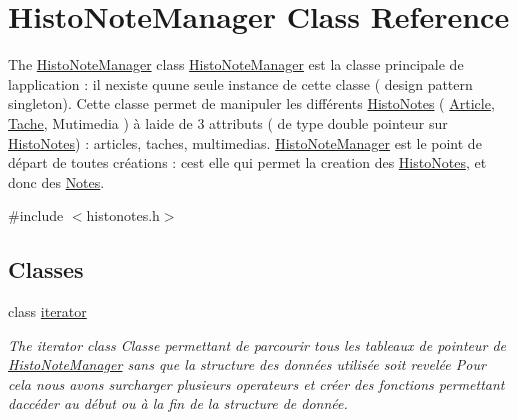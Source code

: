 \hypertarget{class_histo_note_manager}{}\section{Histo\+Note\+Manager Class Reference}
\label{class_histo_note_manager}


The \hyperlink{class_histo_note_manager}{Histo\+Note\+Manager} class \hyperlink{class_histo_note_manager}{Histo\+Note\+Manager} est la classe principale de l\textquotesingle{}application \+: il n\textquotesingle{}existe qu\textquotesingle{}une seule instance de cette classe ( design pattern singleton). Cette classe permet de manipuler les différents \hyperlink{class_histo_notes}{Histo\+Notes} ( \hyperlink{class_article}{Article}, \hyperlink{class_tache}{Tache}, Mutimedia ) à l\textquotesingle{}aide de 3 attributs ( de type double pointeur sur \hyperlink{class_histo_notes}{Histo\+Notes}) \+: articles, taches, multimedias. \hyperlink{class_histo_note_manager}{Histo\+Note\+Manager} est le point de départ de toutes créations \+: c\textquotesingle{}est elle qui permet la creation des \hyperlink{class_histo_notes}{Histo\+Notes}, et donc des \hyperlink{class_notes}{Notes}.  




{\ttfamily \#include $<$histonotes.\+h$>$}

\subsection*{Classes}
\begin{DoxyCompactItemize}
\item 
class \hyperlink{class_histo_note_manager_1_1iterator}{iterator}
\begin{DoxyCompactList}\small\item\em The iterator class Classe permettant de parcourir tous les tableaux de pointeur de \hyperlink{class_histo_note_manager}{Histo\+Note\+Manager} sans que la structure des données utilisée soit revelée Pour cela nous avons surcharger plusieurs operateurs et créer des fonctions permettant d\textquotesingle{}accéder au début ou à la fin de la structure de donnée. \end{DoxyCompactList}\end{DoxyCompactItemize}
